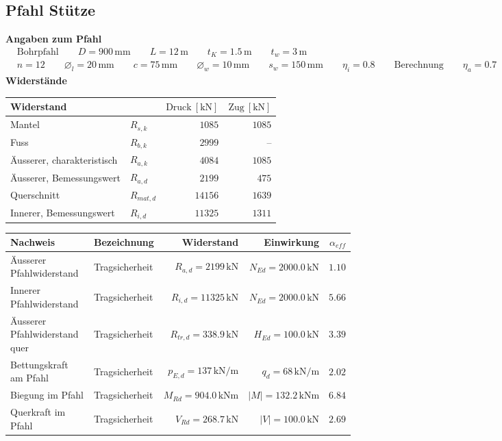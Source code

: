 \documentclass[11pt,a4paper]{article}
\begin{document}
\subsection{Pfahl Stütze}
\noindent\textbf{Angaben zum Pfahl}
\begin{equation*}
\begin{aligned} & \text{Bohrpfahl} \qquad D = 900\,\mathrm{mm} \qquad L = 12\,\mathrm{m} \qquad t_K = 1.5\,\mathrm{m} \qquad t_w = 3\,\mathrm{m} \\ & n = 12 \qquad \varnothing_l = 20\,\mathrm{mm} \qquad c = 75\,\mathrm{mm} \qquad \varnothing_w = 10\,\mathrm{mm} \qquad s_w = 150\,\mathrm{mm} \qquad \eta_i = 0.8 \qquad \text{Berechnung} \qquad \eta_a = 0.7 \end{aligned}
\end{equation*}
\noindent\textbf{Widerstände}
\begin{longtable}{llrr}
\hline
Widerstand &  & $\text{Druck}\ [\mathrm{kN}]$ & $\text{Zug}\ [\mathrm{kN}]$ \\
\hline
\endhead
Mantel & $R_{s,k}$ & $1085$ & $1085$ \\
Fuss & $R_{b,k}$ & $2999$ & – \\
Äusserer, charakteristisch & $R_{a,k}$ & $4084$ & $1085$ \\
Äusserer, Bemessungswert & $R_{a,d}$ & $2199$ & $475$ \\
Querschnitt & $R_{mat,d}$ & $14156$ & $1639$ \\
Innerer, Bemessungswert & $R_{i,d}$ & $11325$ & $1311$ \\
\hline
\end{longtable}
\begin{xltabular}{\linewidth}{>{\raggedright\arraybackslash}X>{\raggedright\arraybackslash}Xrrr}
\hline
Nachweis & Bezeichnung & Widerstand & Einwirkung & $\alpha_{eff}$ \\
\hline
\endhead
Äusserer Pfahlwiderstand & Tragsicherheit & $R_{a,d} = 2199\,\mathrm{kN}$ & $N_{Ed} = 2000.0\,\mathrm{kN}$ & $1.10$ \\
Innerer Pfahlwiderstand & Tragsicherheit & $R_{i,d} = 11325\,\mathrm{kN}$ & $N_{Ed} = 2000.0\,\mathrm{kN}$ & $5.66$ \\
Äusserer Pfahlwiderstand quer & Tragsicherheit & $R_{tr,d} = 338.9\,\mathrm{kN}$ & $H_{Ed} = 100.0\,\mathrm{kN}$ & $3.39$ \\
Bettungskraft am Pfahl & Tragsicherheit & $p_{E,d} = 137\,\mathrm{kN}/\mathrm{m}$ & $q_d = 68\,\mathrm{kN}/\mathrm{m}$ & $2.02$ \\
Biegung im Pfahl & Tragsicherheit & $M_{Rd} = 904.0\,\mathrm{kNm}$ & $\left|M\right| = 132.2\,\mathrm{kNm}$ & $6.84$ \\
Querkraft im Pfahl & Tragsicherheit & $V_{Rd} = 268.7\,\mathrm{kN}$ & $\left|V\right| = 100.0\,\mathrm{kN}$ & $2.69$ \\
\hline
\end{xltabular}
\end{document}
